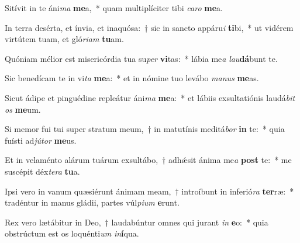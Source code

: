 \item Sitívit in te áni\textit{ma} \textbf{me}a,~* quam multiplíciter tibi \textit{ca}\textit{ro} \textbf{me}a.
\item In terra desérta, et ínvia, et inaquósa:~† sic in sancto appáru\textit{i} \textbf{ti}bi,~* ut vidérem virtútem tuam, et gló\textit{ri}\textit{am} \textbf{tu}am.
\item Quóniam mélior est misericórdia tua su\textit{per} \textbf{vi}tas:~* lábia me\textit{a} \textit{lau}\textbf{dá}bunt te.
\item Sic benedícam te in vi\textit{ta} \textbf{me}a:~* et in nómine tuo levábo \textit{ma}\textit{nus} \textbf{me}as.
\item Sicut ádipe et pinguédine repleátur áni\textit{ma} \textbf{me}a:~* et lábiis exsultatiónis laudá\textit{bit} \textit{os} \textbf{me}um.
\item Si memor fui tui super stratum meum,~† in matutínis meditá\textit{bor} \textbf{in} te:~* quia fuísti ad\textit{jú}\textit{tor} \textbf{me}us.
\item Et in velaménto alárum tuárum exsultábo,~† adhǽsit ánima me\textit{a} \textbf{post} te:~* me suscépit déx\textit{te}\textit{ra} \textbf{tu}a.
\item Ipsi vero in vanum quæsiérunt ánimam meam,~† introíbunt in inferió\textit{ra} \textbf{ter}ræ:~* tradéntur in manus gládii, partes vúl\textit{pi}\textit{um} \textbf{e}runt.
\item Rex vero lætábitur in Deo,~† laudabúntur omnes qui jurant \textit{in} \textbf{e}o:~* quia obstrúctum est os loquénti\textit{um} \textit{in}\textbf{í}qua.
